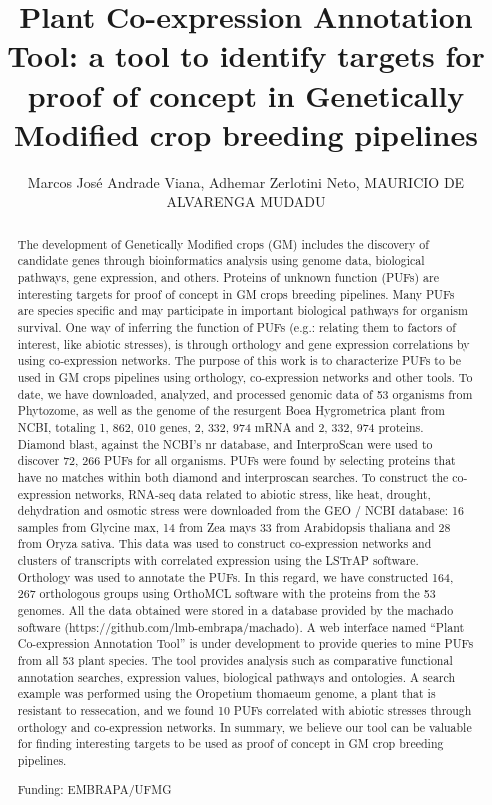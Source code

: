 \documentclass[twoside]{article}
\title{\vspace{-15mm}\fontsize{24pt}{10pt}\selectfont\textbf{ Plant Co-expression Annotation Tool: a tool to identify targets for proof of concept in Genetically Modified crop breeding pipelines }} %
\author{ Marcos Jos\'e Andrade Viana, Adhemar Zerlotini Neto, MAURICIO DE ALVARENGA MUDADU }
\affil{ UFMG/EMBRAPA }
\date{}
\begin{document}
  
  
  \maketitle %
  
  
  \thispagestyle{fancy} %
  
  
  \begin{abstract}
  The development of Genetically Modified crops (GM) includes the discovery of candidate genes through bioinformatics analysis using genome data,  biological pathways,  gene expression,  and others. Proteins of unknown function (PUFs) are interesting targets for proof of concept in GM crops breeding pipelines. Many PUFs are species specific and may participate in important biological pathways for organism survival. One way of inferring the function of PUFs (e.g.: relating them to factors of interest,  like abiotic stresses),  is through orthology and gene expression correlations by using co-expression networks. The purpose of this work is to characterize PUFs to be used in GM crops pipelines using orthology,  co-expression networks and other tools. To date,  we have downloaded,  analyzed,  and processed genomic data of 53 organisms from Phytozome,  as well as the genome of the resurgent Boea Hygrometrica plant from NCBI,  totaling 1, 862, 010 genes,  2, 332, 974 mRNA and 2, 332, 974 proteins. Diamond blast,  against the NCBI’s nr database,  and InterproScan were used to discover 72, 266 PUFs for all organisms. PUFs were found by selecting proteins that have no matches within both diamond and interproscan searches. To construct the co-expression networks,  RNA-seq data related to abiotic stress,  like heat,  drought,  dehydration and osmotic stress were downloaded from the GEO / NCBI database: 16 samples from Glycine max,   14 from Zea mays  33 from Arabidopsis thaliana and 28 from Oryza sativa. This data was used to construct co-expression networks and clusters of transcripts with correlated expression using the LSTrAP software. Orthology was used to annotate the PUFs. In this regard,  we have constructed 164, 267 orthologous groups using OrthoMCL software with the proteins from the 53 genomes. All the data obtained were stored in a database provided by the machado software (https://github.com/lmb-embrapa/machado). A web interface named “Plant Co-expression Annotation Tool” is under development to provide queries to mine PUFs from all 53 plant species. The tool provides analysis such as comparative functional annotation searches,  expression values,  biological pathways and ontologies. A search example was performed using the Oropetium thomaeum genome,  a plant that is resistant to ressecation,  and we found 10 PUFs correlated with abiotic stresses through orthology and co-expression networks. In summary,  we believe our tool can be valuable for finding interesting targets to be used as proof of concept in GM crop breeding pipelines.
  
  Funding: EMBRAPA/UFMG \\ 
  \end{abstract}
  
\end{document}
